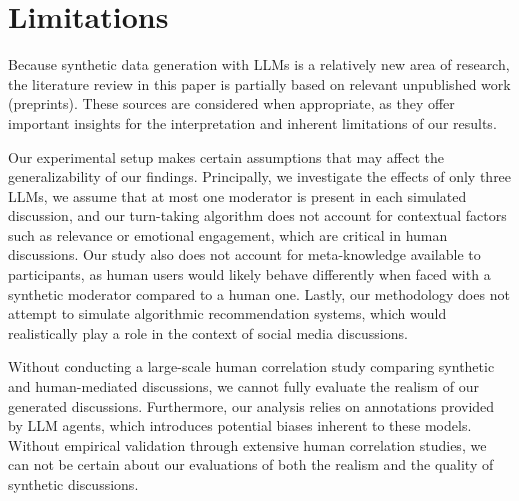 %
\section{Limitations} 
\label{sec:limitations}

Because synthetic data generation with \acp{LLM} is a relatively new area of research, the literature review in this paper is partially based on relevant unpublished work (preprints). These sources are considered when appropriate, as they offer important insights for the interpretation and inherent limitations of our results.

Our experimental setup makes certain assumptions that may affect the generalizability of our findings. Principally, we investigate the effects of only three \acp{LLM}, we assume that at most one moderator is present in each simulated discussion, and our turn-taking algorithm does not account for contextual factors such as relevance or emotional engagement, which are critical in human discussions. Our study also does not account for meta-knowledge available to participants, as human users would likely behave differently when faced with a synthetic moderator compared to a human one. Lastly, our methodology does not attempt to simulate algorithmic recommendation systems, which would realistically play a role in the context of social media discussions.

Without conducting a large-scale human correlation study comparing synthetic and human-mediated discussions, we cannot fully evaluate the realism of our generated discussions. Furthermore, our analysis relies on annotations provided by \ac{LLM} agents, which introduces potential biases inherent to these models. Without empirical validation through extensive human correlation studies, we can not be certain about our evaluations of both the realism and the quality of synthetic discussions.